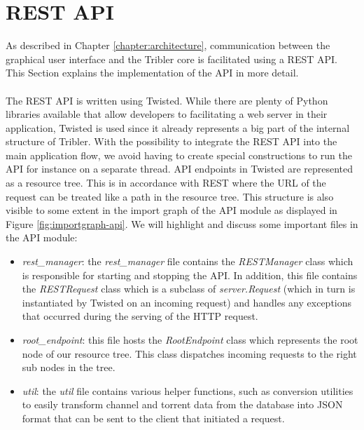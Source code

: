 \section{REST API}
As described in Chapter \ref{chapter:architecture}, communication between the graphical user interface and the Tribler core is facilitated using a REST API. This Section explains the implementation of the API in more detail.\\\\
The REST API is written using Twisted. While there are plenty of Python libraries available that allow developers to facilitating a web server in their application, Twisted is used since it already represents a big part of the internal structure of Tribler. With the possibility to integrate the REST API into the main application flow, we avoid having to create special constructions to run the API for instance on a separate thread. API endpoints in Twisted are represented as a resource tree. This is in accordance with REST where the URL of the request can be treated like a path in the resource tree. This structure is also visible to some extent in the import graph of the API module as displayed in Figure \ref{fig:importgraph-api}. We will highlight and discuss some important files in the API module:
\begin{itemize}
	\item \emph{rest\_manager}: the \emph{rest\_manager} file contains the \emph{RESTManager} class which is responsible for starting and stopping the API. In addition, this file contains the \emph{RESTRequest} class which is a subclass of \emph{server.Request} (which in turn is instantiated by Twisted on an incoming request) and handles any exceptions that occurred during the serving of the HTTP request.
	\item \emph{root\_endpoint}: this file hosts the \emph{RootEndpoint} class which represents the root node of our resource tree. This class dispatches incoming requests to the right sub nodes in the tree.
	\item \emph{util}: the \emph{util} file contains various helper functions, such as conversion utilities to easily transform channel and torrent data from the database into JSON format that can be sent to the client that initiated a request.
\end{itemize}


